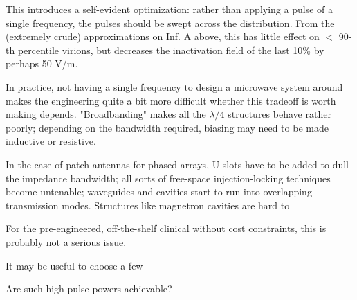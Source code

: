 \documentclass[paper.tex]{subfiles}
\begin{document}

This introduces a self-evident optimization: rather than applying a pulse of a single frequency, the pulses should be swept across the distribution. From the (extremely crude) approximations on Inf. A above, this has little effect on $<$ 90-th percentile virions, but decreases the inactivation field of the last 10\% by perhaps 50 V/m.

In practice, not having a single frequency to design a microwave system around makes the engineering quite a bit more difficult whether this tradeoff is worth making depends. "Broadbanding" makes all the $\lambda / 4$ structures behave rather poorly; depending on the bandwidth required, biasing may need to be made inductive or resistive.

In the case of patch antennas for phased arrays, U-slots have to be added to dull the impedance bandwidth; all sorts of free-space injection-locking techniques become untenable; waveguides and cavities start to run into overlapping transmission modes. Structures like magnetron cavities are hard to 

For the pre-engineered, off-the-shelf clinical without cost constraints, this is probably not a serious issue.

It may be useful to choose a few 

Are such high pulse powers achievable? 




	
\end{document}
